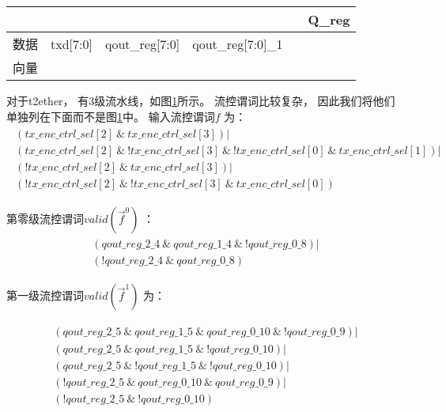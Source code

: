 \begin{table}[t]
\begin{tabular}{|c|c|c|c|c|c|}
                       &                              &                           &                    &                 &Q\_reg                         \\\hline
数据                   &txd[7:0]                      &qout\_reg[7:0]             &qout\_reg[7:0]\_1   &                 &                         \\
向量                   &                              &                           &                    &                 &                         \\\hline
\end{tabular}\label{tab_t2ether}
\end{table}


对于t2ether，
有3级流水线，如图\ref{tab_t2ether}所示。
流控谓词比较复杂，
因此我们将他们单独列在下面而不是图\ref{tab_t2ether}中。
输入流控谓词$f$ 为：
\begin{multline}
\begin{array}{l}
( tx\_enc\_ctrl\_sel[2]~\&~tx\_enc\_ctrl\_sel[3] ) | \\
( tx\_enc\_ctrl\_sel[2]~\&~!tx\_enc\_ctrl\_sel[3]~\&~!tx\_enc\_ctrl\_sel[0]~\&~tx\_enc\_ctrl\_sel[1] ) | \\
( !tx\_enc\_ctrl\_sel[2]~\&~tx\_enc\_ctrl\_sel[3] ) | \\
( !tx\_enc\_ctrl\_sel[2]~\&~!tx\_enc\_ctrl\_sel[3]~\&~tx\_enc\_ctrl\_sel[0] )
\end{array}
\end{multline}

第零级流控谓词$valid(\vec{f}^0)$ ：
\begin{multline}
\begin{array}{l}
( qout\_reg\_2\_4~\&~qout\_reg\_1\_4~\&~!qout\_reg\_0\_8) | \\
( !qout\_reg\_2\_4~\&~qout\_reg\_0\_8)
\end{array}
\end{multline}

第一级流控谓词$valid(\vec{f}^1)$ 为：

\begin{multline}
\begin{array}{l}
( qout\_reg\_2\_5~\&~qout\_reg\_1\_5~\&~qout\_reg\_0\_10~\&~!qout\_reg\_0\_9) | \\
( qout\_reg\_2\_5~\&~qout\_reg\_1\_5~\&~!qout\_reg\_0\_10) | \\
( qout\_reg\_2\_5~\&~!qout\_reg\_1\_5~\&~!qout\_reg\_0\_10) | \\
( !qout\_reg\_2\_5~\&~qout\_reg\_0\_10~\&~qout\_reg\_0\_9) | \\
( !qout\_reg\_2\_5~\&~!qout\_reg\_0\_10)
\end{array}
\end{multline}


